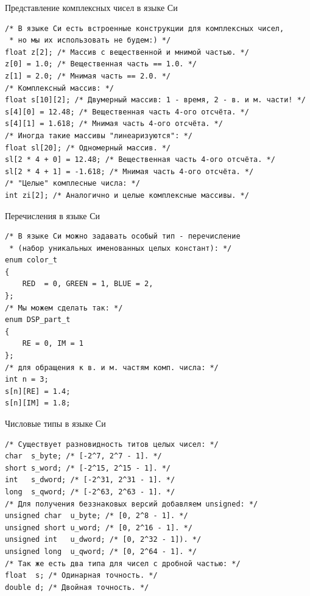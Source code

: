 \documentclass{beamer}
\begin{document}
    \begin{frame}[fragile]{Представление комплексных чисел в языке Си}
        \begin{verbatim}
/* В языке Си есть встроенные конструкции для комплексных чисел,
 * но мы их использовать не будем:) */
float z[2]; /* Массив с вещественной и мнимой частью. */
z[0] = 1.0; /* Вещественная часть == 1.0. */
z[1] = 2.0; /* Мнимая часть == 2.0. */
/* Комплексный массив: */
float s[10][2]; /* Двумерный массив: 1 - время, 2 - в. и м. части! */
s[4][0] = 12.48; /* Вещественная часть 4-ого отсчёта. */
s[4][1] = 1.618; /* Мнимая часть 4-ого отсчёта. */
/* Иногда такие массивы "линеаризуются": */
float sl[20]; /* Одномерный массив. */
sl[2 * 4 + 0] = 12.48; /* Вещественная часть 4-ого отсчёта. */
sl[2 * 4 + 1] = -1.618; /* Мнимая часть 4-ого отсчёта. */
/* "Целые" комплесные числа: */
int zi[2]; /* Аналогично и целые комплексные массивы. */
        \end{verbatim}
    \end{frame}
    \begin{frame}[fragile]{Перечисления в языке Си}
        \begin{verbatim}
/* В языке Си можно задавать особый тип - перечисление
 * (набор уникальных именованных целых констант): */
enum color_t
{
    RED  = 0, GREEN = 1, BLUE = 2,
};
/* Мы можем сделать так: */
enum DSP_part_t
{
    RE = 0, IM = 1
};
/* для обращения к в. и м. частям комп. числа: */
int n = 3;
s[n][RE] = 1.4; 
s[n][IM] = 1.8;
        \end{verbatim}
    \end{frame}
    \begin{frame}[fragile]{Числовые типы в языке Си}
        \begin{verbatim}
/* Существует разновидность титов целых чисел: */
char  s_byte; /* [-2^7, 2^7 - 1]. */
short s_word; /* [-2^15, 2^15 - 1]. */
int   s_dword; /* [-2^31, 2^31 - 1]. */
long  s_qword; /* [-2^63, 2^63 - 1]. */
/* Для получения беззнаковых версий добавляем unsigned: */
unsigned char  u_byte; /* [0, 2^8 - 1]. */
unsigned short u_word; /* [0, 2^16 - 1]. */
unsigned int   u_dword; /* [0, 2^32 - 1]). */
unsigned long  u_qword; /* [0, 2^64 - 1]. */
/* Так же есть два типа для чисел с дробной частью: */
float  s; /* Одинарная точность. */
double d; /* Двойная точность. */
        \end{verbatim}
    \end{frame}
\end{document}
